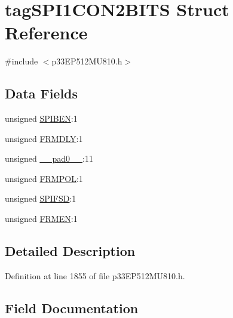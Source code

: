 \hypertarget{structtag_s_p_i1_c_o_n2_b_i_t_s}{}\section{tag\+S\+P\+I1\+C\+O\+N2\+B\+I\+TS Struct Reference}
\label{structtag_s_p_i1_c_o_n2_b_i_t_s}


{\ttfamily \#include $<$p33\+E\+P512\+M\+U810.\+h$>$}

\subsection*{Data Fields}
\begin{DoxyCompactItemize}
\item 
unsigned \hyperlink{structtag_s_p_i1_c_o_n2_b_i_t_s_a48f1b49d7589da2ee8c38cd6d820a542}{S\+P\+I\+B\+EN}\+:1
\item 
unsigned \hyperlink{structtag_s_p_i1_c_o_n2_b_i_t_s_abc2e71af924cda26b91c8945dc68c1d4}{F\+R\+M\+D\+LY}\+:1
\item 
unsigned \hyperlink{structtag_s_p_i1_c_o_n2_b_i_t_s_adf71f3d8410c1f1dbbc96680a92c49af}{\+\_\+\+\_\+pad0\+\_\+\+\_\+}\+:11
\item 
unsigned \hyperlink{structtag_s_p_i1_c_o_n2_b_i_t_s_a3f77b33ab0ae8182d247d8a75ce9795f}{F\+R\+M\+P\+OL}\+:1
\item 
unsigned \hyperlink{structtag_s_p_i1_c_o_n2_b_i_t_s_aeb3b552a9f7c25bc1ae09655904e34cc}{S\+P\+I\+F\+SD}\+:1
\item 
unsigned \hyperlink{structtag_s_p_i1_c_o_n2_b_i_t_s_a312bafba1b24944c8dfc39323e8fd4e9}{F\+R\+M\+EN}\+:1
\end{DoxyCompactItemize}


\subsection{Detailed Description}


Definition at line 1855 of file p33\+E\+P512\+M\+U810.\+h.



\subsection{Field Documentation}
\mbox{\label{structtag_s_p_i1_c_o_n2_b_i_t_s_adf71f3d8410c1f1dbbc96680a92c49af}} 
